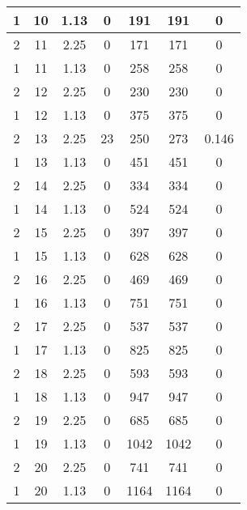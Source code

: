 \documentclass[letterpaper, 12pt]{article}
\begin{document}
\begin{longtable}{|c|c|c|c|c|c|c|}
\hline
1 & 10 & 1.13 & 0 & 191 & 191 & 0 \\
\hline
2 & 11 & 2.25 & 0 & 171 & 171 & 0 \\
\hline
1 & 11 & 1.13 & 0 & 258 & 258 & 0 \\
\hline
2 & 12 & 2.25 & 0 & 230 & 230 & 0 \\
\hline
1 & 12 & 1.13 & 0 & 375 & 375 & 0 \\
\hline
2 & 13 & 2.25 & 23 & 250 & 273 & 0.146 \\
\hline
1 & 13 & 1.13 & 0 & 451 & 451 & 0 \\
\hline
2 & 14 & 2.25 & 0 & 334 & 334 & 0 \\
\hline
1 & 14 & 1.13 & 0 & 524 & 524 & 0 \\
\hline
2 & 15 & 2.25 & 0 & 397 & 397 & 0 \\
\hline
1 & 15 & 1.13 & 0 & 628 & 628 & 0 \\
\hline
2 & 16 & 2.25 & 0 & 469 & 469 & 0 \\
\hline
1 & 16 & 1.13 & 0 & 751 & 751 & 0 \\
\hline
2 & 17 & 2.25 & 0 & 537 & 537 & 0 \\
\hline
1 & 17 & 1.13 & 0 & 825 & 825 & 0 \\
\hline
2 & 18 & 2.25 & 0 & 593 & 593 & 0 \\
\hline
1 & 18 & 1.13 & 0 & 947 & 947 & 0 \\
\hline
2 & 19 & 2.25 & 0 & 685 & 685 & 0 \\
\hline
1 & 19 & 1.13 & 0 & 1042 & 1042 & 0 \\
\hline
2 & 20 & 2.25 & 0 & 741 & 741 & 0 \\
\hline
1 & 20 & 1.13 & 0 & 1164 & 1164 & 0 \\
\hline
\end{longtable}
\end{document}
